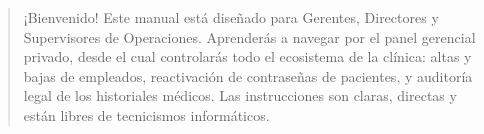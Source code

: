 \documentclass[11pt,a4paper]{article}
\begin{document}


\begin{abstract}
\noindent ¡Bienvenido! Este manual está diseñado para Gerentes, Directores y Supervisores de Operaciones. Aprenderás a navegar por el panel gerencial privado, desde el cual controlarás todo el ecosistema de la clínica: altas y bajas de empleados, reactivación de contraseñas de pacientes, y auditoría legal de los historiales médicos. Las instrucciones son claras, directas y están libres de tecnicismos informáticos.
\end{abstract}

\newpage
\tableofcontents
\newpage





\end{document}
